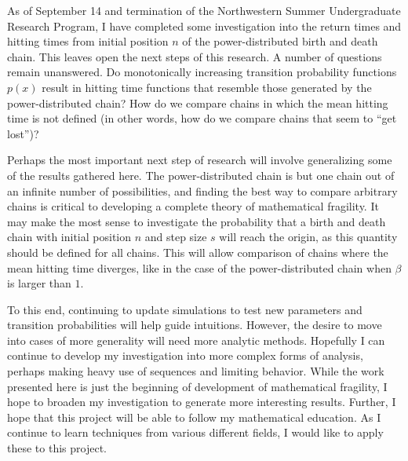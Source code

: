 As of September 14 and termination of the Northwestern Summer Undergraduate Research Program, I have
completed some investigation into the return times and hitting times from initial position $n$ of the
power-distributed birth and death chain. This leaves open the next steps of this research. A number of
questions remain unanswered. Do monotonically increasing transition probability functions $p(x)$ result
in hitting time functions that resemble those generated by the power-distributed chain? How do we
compare chains in which the mean hitting time is not defined (in other words, how do we compare chains
that seem to ``get lost'')?

Perhaps the most important next step of research will involve generalizing some of the results gathered
here. The power-distributed chain is but one chain out of an infinite number of possibilities, and
finding the best way to compare arbitrary chains is critical to developing a complete theory of
mathematical fragility. It may make the most sense to investigate the probability that a birth and death
chain with initial position $n$ and step size $s$ will reach the origin, as this quantity should be
defined for all chains. This will allow comparison of chains where the mean hitting time diverges, like
in the case of the power-distributed chain when $\beta$ is larger than $1$.

To this end, continuing to update simulations to test new parameters and transition probabilities will
help guide intuitions. However, the desire to move into cases of more generality will need more analytic
methods. Hopefully I can continue to develop my investigation into more complex forms of analysis,
perhaps making heavy use of sequences and limiting behavior. While the work presented here is just the
beginning of development of mathematical fragility, I hope to broaden my investigation to generate more
interesting results. Further, I hope that this project will be able to follow my mathematical education.
As I continue to learn techniques from various different fields, I would like to apply these to this
project.
